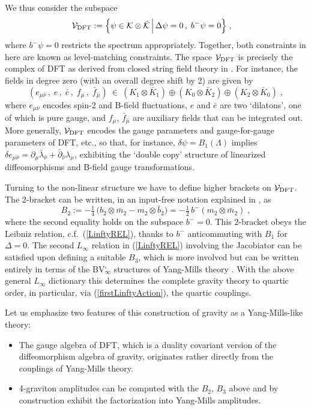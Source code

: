 \documentclass[12pt]{article}\pdfoutput=1
\def\B{\square}
\def\be{\begin{equation}}
\def\ee{\end{equation}}
\begin{document}
We thus consider  the subspace 
 \be
 \begin{split}
  &{\cal V}_{\rm DFT} := \Big\{ \psi\in {\cal K}\otimes \bar{\cal K} \,\Big|\, \Delta \psi=0\,,\; b^-\psi=0\Big\}\;, 
  \end{split} 
 \ee
where $b^-\psi=0$ restricts the spectrum appropriately. Together, both constraints in here 
are known as level-matching constraints. The space ${\cal V}_{\rm DFT}$  is precisely 
the complex of DFT as derived from closed string field theory in \cite{Hull:2009mi}. 
For instance, the fields in degree zero (with an overall degree shift by 2) are given by 
 \be
  (e_{\mu\bar{\nu}}\,, \;e\,, \; \bar{e}\,, \; f_{\mu}\,, \; \bar{f}_{\bar{\mu}}) \ \in \ (K_1\otimes \bar{K}_1) 
  \oplus (K_0\otimes \bar{K}_2) \oplus (K_2\otimes \bar{K}_0) \;, 
 \ee
where $e_{\mu\bar{\nu}}$ encodes spin-2 and B-field fluctuations, $e$ and $\bar{e}$ are two `dilatons', one of which 
is pure gauge, and $f_{\mu}$, $\bar{f}_{\bar{\mu}}$ are auxiliary fields that can be integrated out.   
More generally, ${\cal V}_{\rm DFT}$ encodes the gauge parameters  and gauge-for-gauge parameters  of DFT, etc., 
so that, for instance, $\delta \psi = B_1(\Lambda)$ implies 
  $\delta e_{\mu\bar{\nu}} = \partial_{\mu}\bar{\lambda}_{\bar{\nu}}  + \bar{\partial}_{\bar{\nu}}\lambda_{\mu}$,
exhibiting  the `double copy' structure of linearized diffeomorphisms and B-field gauge transformations. 



Turning to the non-linear structure we have to define higher brackets on  ${\cal V}_{\rm DFT}$. 
The 2-bracket can be written, in an input-free notation explained in \cite{Bonezzi:2022bse},  as 
\be
B_2:=-\tfrac14\,\big(b_2\otimes\bar m_2-m_2\otimes\bar b_2\big) = -\tfrac{1}{2}\, b^-(m_2\otimes \bar{m}_2)\;,  
\ee
where the second equality holds on the subspace $b^-=0$. 
This 2-bracket  obeys the Leibniz relation, c.f.~(\ref{LinftyREL}), thanks to $b^-$ anticommuting with $B_1$ for $\Delta=0$. 
The second $L_{\infty}$ relation in (\ref{LinftyREL}) involving the Jacobiator  can be satisfied upon defining a suitable $B_3$, 
which is more involved  but can be written entirely in terms of the BV$_{\infty}^{\B}$ 
structures of Yang-Mills theory \cite{Bonezzi:2022bse}. With the above general  $L_{\infty}$  dictionary this determines the 
complete gravity theory to quartic order, in particular, via (\ref{firstLinftyAction}), the quartic couplings. 

Let us emphasize two  features of this construction of gravity  as a Yang-Mills-like theory:
\begin{itemize}
 \item The gauge algebra of DFT, which is  a duality covariant version of the diffeomorphism algebra of gravity, 
 originates rather directly from  the  couplings  of Yang-Mills theory. 
 \item 4-graviton amplitudes can be computed with the $B_2$, $B_3$ above  and by construction  exhibit the 
 factorization into Yang-Mills amplitudes.
\end{itemize}
\end{document}
